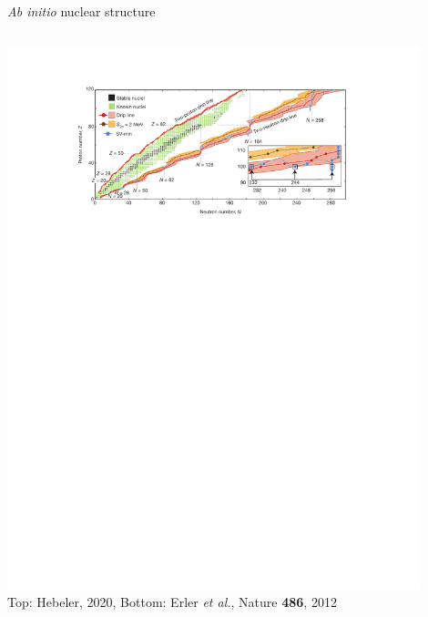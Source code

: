 \documentclass[aspectratio=169]{beamer}
\begin{document}
\begin{frame}{\textit{Ab initio} nuclear structure}
\begin{columns}[t]
\begin{column}{0.50\textwidth}
\begin{center}
        \includegraphics[width=0.9\textwidth]{thesis/talk/images/external/nuclear_landscape_embedded.pdf} \\
        {\tiny Top: Hebeler, 2020, Bottom: Erler \textit{et al.}, Nature \textbf{486}, 2012}
      \end{center}
    \end{column}
  \end{columns}
\end{frame}
\end{document}
